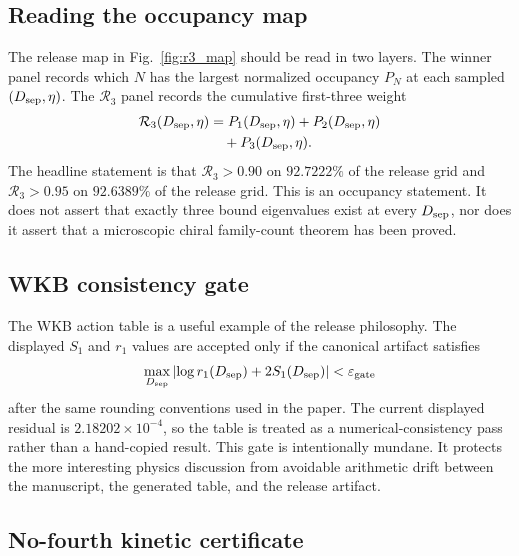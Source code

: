 \documentclass[pdflatex,sn-mathphys-num,iicol]{sn-jnl}
\newcommand{\Rthree}{\mathcal{R}_3}
\newcommand{\Dsep}{D_{\rm sep}}
\newcommand{\ReleaseRthreeGTNinety}{92.7222\%}
\newcommand{\ReleaseRthreeGTNinetyFive}{92.6389\%}
\newcommand{\ReleaseTableIIIResidual}{2.18202\times 10^{-4}}
\begin{document}
\subsection{Reading the occupancy map}

The release map in Fig.~\ref{fig:r3_map} should be read in two layers.
The winner panel records which \(N\) has the largest normalized occupancy \(P_N\) at each sampled \((\Dsep,\eta)\).
The \(\Rthree\) panel records the cumulative first-three weight
\begin{equation}
    \begin{aligned}
    \Rthree(\Dsep,\eta)
    &=
    P_1(\Dsep,\eta)
    +P_2(\Dsep,\eta)\\
    &\quad
    +P_3(\Dsep,\eta).
    \end{aligned}
\end{equation}
The headline statement is that \(\Rthree>0.90\) on \(\ReleaseRthreeGTNinety\) of the release grid and \(\Rthree>0.95\) on \(\ReleaseRthreeGTNinetyFive\) of the release grid.
This is an occupancy statement.
It does not assert that exactly three bound eigenvalues exist at every \(\Dsep\), nor does it assert that a microscopic chiral family-count theorem has been proved.

\subsection{WKB consistency gate}

The WKB action table is a useful example of the release philosophy.
The displayed \(S_1\) and \(r_1\) values are accepted only if the canonical artifact satisfies
\begin{equation}
    \max_{\Dsep}\left|\log r_1(\Dsep)+2S_1(\Dsep)\right|
    <\varepsilon_{\rm gate}
    \label{eq:wkb_gate}
\end{equation}
after the same rounding conventions used in the paper.
The current displayed residual is \(\ReleaseTableIIIResidual\), so the table is treated as a numerical-consistency pass rather than a hand-copied result.
This gate is intentionally mundane.
It protects the more interesting physics discussion from avoidable arithmetic drift between the manuscript, the generated table, and the release artifact.

\subsection{No-fourth kinetic certificate}
\end{document}
